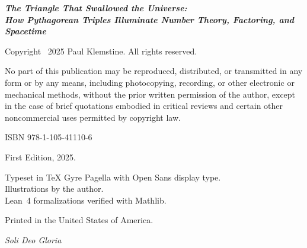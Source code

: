 \documentclass[11pt,openright,twoside,extrafontsizes]{memoir}
\theoremstyle{definition}
\begin{document}
\vspace*{\fill}
\begin{flushleft}
\small

\textbf{\emph{The Triangle That Swallowed the Universe:}}\\
\textbf{\emph{How Pythagorean Triples Illuminate Number Theory, Factoring, and Spacetime}}

\vspace{12pt}

Copyright \textcopyright\ 2025 Paul Klemstine. All rights reserved.

\vspace{8pt}

No part of this publication may be reproduced, distributed, or transmitted
in any form or by any means, including photocopying, recording, or other
electronic or mechanical methods, without the prior written permission of
the author, except in the case of brief quotations embodied in critical
reviews and certain other noncommercial uses permitted by copyright law.

\vspace{12pt}

ISBN 978-1-105-41110-6

\vspace{12pt}

First Edition, 2025.

\vspace{8pt}

Typeset in TeX Gyre Pagella with Open Sans display type.\\
Illustrations by the author.\\
Lean~4 formalizations verified with Mathlib.

\vspace{8pt}

Printed in the United States of America.

\end{flushleft}
\vspace*{\fill}
\cleardoublepage

\vspace*{\fill}
\begin{center}
{\sffamily\Large\itshape\color{chaptercolor}%
Soli Deo Gloria}
\end{center}
\vspace*{\fill}
\cleardoublepage

\pagestyle{bookstyle}
\renewcommand{\contentsname}{Contents}
\tableofcontents*
\cleardoublepage
\end{document}
